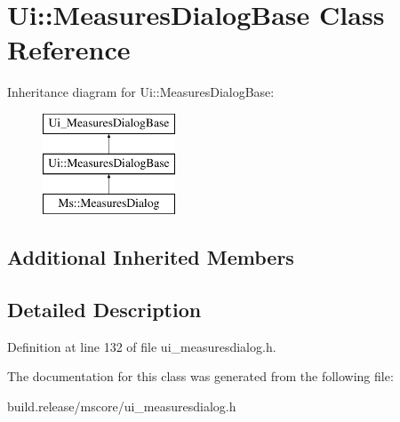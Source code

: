 \hypertarget{class_ui_1_1_measures_dialog_base}{}\section{Ui\+:\+:Measures\+Dialog\+Base Class Reference}
\label{class_ui_1_1_measures_dialog_base}
Inheritance diagram for Ui\+:\+:Measures\+Dialog\+Base\+:\begin{figure}[H]
\begin{center}
\leavevmode
\includegraphics[height=3.000000cm]{class_ui_1_1_measures_dialog_base}
\end{center}
\end{figure}
\subsection*{Additional Inherited Members}


\subsection{Detailed Description}


Definition at line 132 of file ui\+\_\+measuresdialog.\+h.



The documentation for this class was generated from the following file\+:\begin{DoxyCompactItemize}
\item 
build.\+release/mscore/ui\+\_\+measuresdialog.\+h\end{DoxyCompactItemize}
